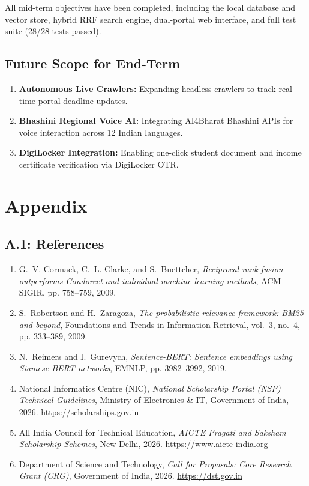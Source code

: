 \documentclass[12pt,a4paper]{article}
\begin{document}
All mid-term objectives have been completed, including the local database and vector store, hybrid RRF search engine, dual-portal web interface, and full test suite (28/28 tests passed).

\subsection*{Future Scope for End-Term}
\begin{enumerate}[itemsep=2pt]
    \item \textbf{Autonomous Live Crawlers:} Expanding headless crawlers to track real-time portal deadline updates.
    \item \textbf{Bhashini Regional Voice AI:} Integrating AI4Bharat Bhashini APIs for voice interaction across 12 Indian languages.
    \item \textbf{DigiLocker Integration:} Enabling one-click student document and income certificate verification via DigiLocker OTR.
\end{enumerate}

\section{Appendix}

\subsection*{A.1: References}

\begin{enumerate}[itemsep=3pt]
    \item G.~V. Cormack, C.~L. Clarke, and S.~Buettcher, \textit{Reciprocal rank fusion outperforms Condorcet and individual machine learning methods}, ACM SIGIR, pp. 758--759, 2009.
    \item S.~Robertson and H.~Zaragoza, \textit{The probabilistic relevance framework: BM25 and beyond}, Foundations and Trends in Information Retrieval, vol.~3, no.~4, pp. 333--389, 2009.
    \item N.~Reimers and I.~Gurevych, \textit{Sentence-BERT: Sentence embeddings using Siamese BERT-networks}, EMNLP, pp. 3982--3992, 2019.
    \item National Informatics Centre (NIC), \textit{National Scholarship Portal (NSP) Technical Guidelines}, Ministry of Electronics \& IT, Government of India, 2026. \url{https://scholarships.gov.in}
    \item All India Council for Technical Education, \textit{AICTE Pragati and Saksham Scholarship Schemes}, New Delhi, 2026. \url{https://www.aicte-india.org}
    \item Department of Science and Technology, \textit{Call for Proposals: Core Research Grant (CRG)}, Government of India, 2026. \url{https://dst.gov.in}
\end{enumerate}
	
\end{document}
